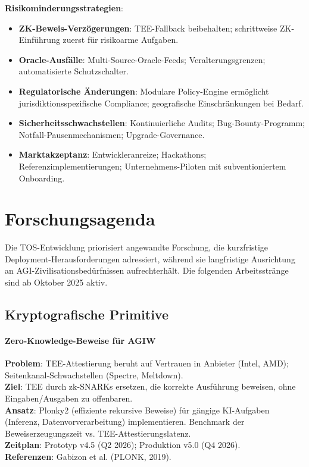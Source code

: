 \documentclass[11pt]{article}
\begin{document}
\textbf{Risikominderungsstrategien}:
\begin{itemize}[noitemsep]
  \item \textbf{ZK-Beweis-Verzögerungen}: TEE-Fallback beibehalten; schrittweise ZK-Einführung zuerst für risikoarme Aufgaben.
  \item \textbf{Oracle-Ausfälle}: Multi-Source-Oracle-Feeds; Veralterungsgrenzen; automatisierte Schutzschalter.
  \item \textbf{Regulatorische Änderungen}: Modulare Policy-Engine ermöglicht jurisdiktionsspezifische Compliance; geografische Einschränkungen bei Bedarf.
  \item \textbf{Sicherheitsschwachstellen}: Kontinuierliche Audits; Bug-Bounty-Programm; Notfall-Pausenmechanismen; Upgrade-Governance.
  \item \textbf{Marktakzeptanz}: Entwickleranreize; Hackathons; Referenzimplementierungen; Unternehmens-Piloten mit subventioniertem Onboarding.
\end{itemize}

\section{Forschungsagenda}
\label{sec:research}

Die TOS-Entwicklung priorisiert angewandte Forschung, die kurzfristige Deployment-Herausforderungen adressiert, während sie langfristige Ausrichtung an AGI-Zivilisationsbedürfnissen aufrechterhält. Die folgenden Arbeitsstränge sind ab Oktober 2025 aktiv.

\subsection{Kryptografische Primitive}

\paragraph{Zero-Knowledge-Beweise für AGIW}
\textbf{Problem}: TEE-Attestierung beruht auf Vertrauen in Anbieter (Intel, AMD); Seitenkanal-Schwachstellen (Spectre, Meltdown).\\
\textbf{Ziel}: TEE durch zk-SNARKs ersetzen, die korrekte Ausführung beweisen, ohne Eingaben/Ausgaben zu offenbaren.\\
\textbf{Ansatz}: Plonky2 (effiziente rekursive Beweise) für gängige KI-Aufgaben (Inferenz, Datenvorverarbeitung) implementieren. Benchmark der Beweiserzeugungszeit vs. TEE-Attestierungslatenz.\\
\textbf{Zeitplan}: Prototyp v4.5 (Q2 2026); Produktion v5.0 (Q4 2026).\\
\textbf{Referenzen}: Gabizon et al. (PLONK, 2019).
\end{document}
